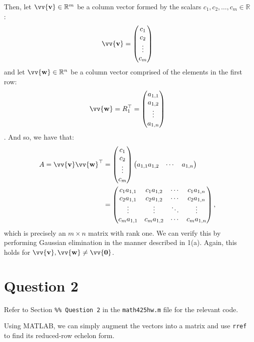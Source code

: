 \documentclass[12pt]{article}
\newcommand{\vect}[1]{\vv{\mathbf{#1}}}
\newcommand{\code}[1]{\texttt{#1}}
\newcommand{\R}{\mathbb{R}}
\begin{document}
Then, let $\vect{v}\in\R^m$ be a column vector formed by the scalars $c_1,c_2,\ldots,c_m\in\R$:
$$
\vect{v}=\begin{pmatrix}
    c_1 \\ c_2 \\ \vdots \\ c_m
\end{pmatrix}
$$
and let $\vect{w}\in\R^n$ be a column vector comprised of the elements in the first row:
$$
\vect{w} = R_1^\top = \begin{pmatrix}
    a_{1,1} \\ a_{1,2} \\ \vdots \\ a_{1,n}
\end{pmatrix}
$$.
And so, we have that:
\begin{align*}
    A = \vect{v}\vect{w}^\top 
    &= \begin{pmatrix}
        c_1 \\ c_2 \\ \vdots \\ c_m
    \end{pmatrix}
    \begin{pmatrix}
        a_{1,1}  a_{1,2} & \cdots & a_{1,n}
    \end{pmatrix}
    \\
    &= \begin{pmatrix}
        c_1a_{1,1} & c_1a_{1,2} & \cdots & c_1a_{1,n} \\
        c_2a_{1,1} & c_2a_{1,2} & \cdots & c_2a_{1,n} \\
        \vdots & \vdots & \ddots & \vdots \\
        c_ma_{1,1} & c_ma_{1,2} & \cdots & c_ma_{1,n} \\
    \end{pmatrix},
\end{align*}
which is precisely an $m\times n$ matrix with rank one. We can verify this by performing Gaussian elimination in the manner described in 1(a). Again, this holds for $\vect{v},\vect{w}\neq\vect{0}$.

\section*{Question 2}

Refer to Section \code{\%\% Question 2} in the \code{math425hw.m} file for the relevant code.

Using MATLAB, we can simply augment the vectors into a matrix and use \code{rref} to find its reduced-row echelon form.
\end{document}
